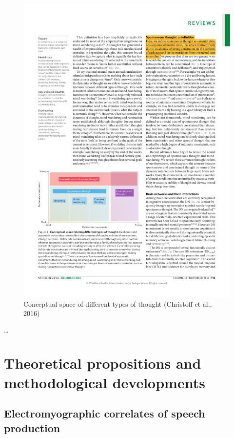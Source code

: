 \documentclass[12pt,]{book}
\theoremstyle{definition}
\theoremstyle{definition}
\theoremstyle{definition}
\theoremstyle{remark}
\begin{document}
\begin{figure}

{\centering \includegraphics[width=17.03in]{assets/conceptual_space} 

}

\caption{Conceptual space of different types of thought (Christoff et al., 2016)}\label{fig:unnamed-chunk-1}
\end{figure}

\ldots{}

\chapter{Theoretical propositions and methodological
developments}\label{theoretical-propositions-and-methodological-developments}

\section{Electromyographic correlates of speech
production}\label{electromyographic-correlates-of-speech-production}
\end{document}

